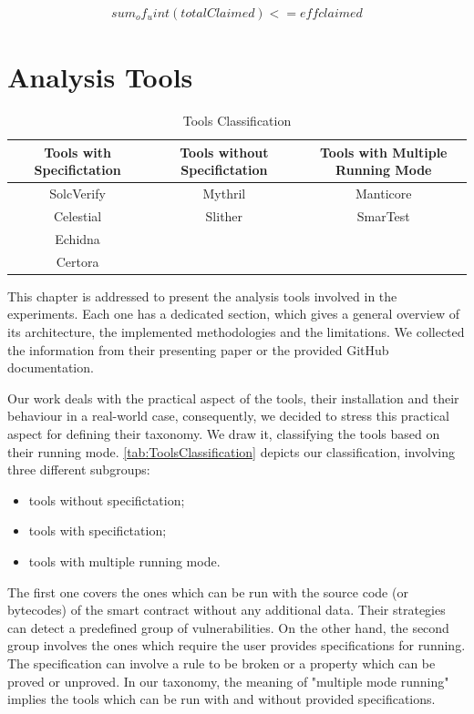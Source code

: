 \begin{equation}
    \begin{split}
        sum_of_uint(totalClaimed) <= effclaimed
    \end{split}
\end{equation}

\chapter{Analysis Tools}
\label{ch:Tools}

\begin{center}
    

\begin{table}
    \caption{Tools Classification}
        \label{tab:ToolsClassification}
        \begin{tabular}{ccc}
        \toprule
            Tools with Specifictation & Tools without Specifictation & Tools with Multiple Running Mode \\
            \midrule
            SolcVerify  & Mythril &  Manticore \\
            Celestial & Slither &  SmarTest \\
            Echidna & & \\
            Certora & & \\ 
        \bottomrule
        \end{tabular}
    \end{table}
\end{center}

This chapter is addressed to present the analysis tools involved in the experiments. 
Each one has a dedicated section, which gives a general overview of its architecture, the implemented methodologies and the limitations. 
We collected the information from their presenting paper or the provided GitHub documentation.

Our work deals with the practical aspect of the tools, their installation and their behaviour in a real-world case, consequently, 
we decided to stress this practical aspect for defining their taxonomy.
We draw it, classifying the tools based on their running mode. \autoref{tab:ToolsClassification} depicts our classification, involving three different subgroups:
\begin{itemize}
    \item tools without specifictation;
    \item tools with specifictation;
    \item tools with multiple running mode.
\end{itemize}
The first one covers the ones which can be run with the source code (or bytecodes) of the smart contract without any additional data. Their strategies can detect a predefined group of vulnerabilities. 
On the other hand, the second group involves the ones which require the user provides specifications for running. The specification can involve a rule to be broken or a property which can be proved or unproved. 
In our taxonomy, the meaning of "multiple mode running" implies the tools which can be run with and without provided specifications. 

